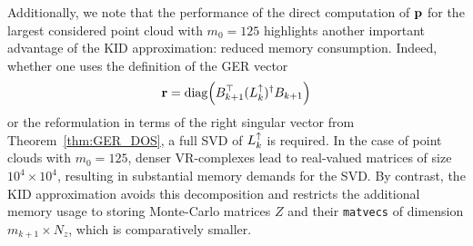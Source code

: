 Additionally, we note that the performance of the direct computation of \(\mathbf{p}\) for the largest considered point cloud with \(m_0 = 125\) highlights another important advantage of the KID approximation: reduced memory consumption. Indeed, whether one uses the definition of the GER vector 
\[
\mathbf{r} 
= \operatorname{diag} \Bigl( B_{k+1}^\top (L_{k}^{\uparrow})^\dagger B_{k+1} \Bigr) 
\]
or the reformulation in terms of the right singular vector from Theorem~\ref{thm:GER_DOS}, a full SVD of \(L_{k}^{\uparrow}\) is required. In the case of point clouds with \(m_0 = 125\), denser VR-complexes lead to real-valued matrices of size \(10^4 \times 10^4\), resulting in substantial memory demands for the SVD. By contrast, the KID approximation avoids this decomposition and restricts the additional memory usage to storing Monte-Carlo matrices \(Z\) and their \texttt{matvecs} of dimension \(m_{k+1} \times N_z\), which is comparatively smaller.